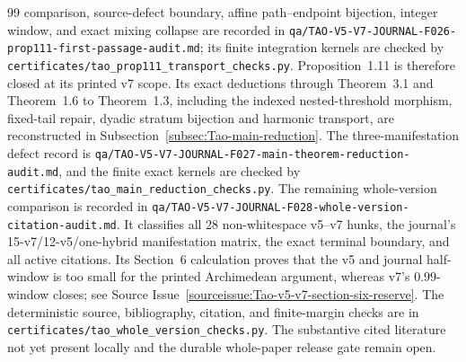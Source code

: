 \begin{thebibliography}{99}
comparison, source-defect boundary, affine path--endpoint bijection, integer
window, and exact mixing collapse are recorded in
\texttt{qa/TAO-V5-V7-JOURNAL-F026-prop111-first-passage-audit.md}; its finite
integration kernels are checked by
\texttt{certificates/tao\_prop111\_transport\_checks.py}.  Proposition~1.11
is therefore closed at its printed v7 scope.  Its exact deductions through
Theorem~3.1 and Theorem~1.6 to Theorem~1.3, including the indexed
nested-threshold morphism, fixed-tail repair, dyadic stratum bijection and
harmonic transport, are reconstructed in
Subsection~\ref{subsec:Tao-main-reduction}.  The three-manifestation defect
record is
\texttt{qa/TAO-V5-V7-JOURNAL-F027-main-theorem-reduction-audit.md}, and the
finite exact kernels are checked by
\texttt{certificates/tao\_main\_reduction\_checks.py}.  The remaining
whole-version comparison is recorded in
\texttt{qa/TAO-V5-V7-JOURNAL-F028-whole-version-citation-audit.md}.
It classifies all 28 non-whitespace v5--v7 hunks, the journal's
15-v7/12-v5/one-hybrid manifestation matrix, the exact terminal boundary,
and all active citations.  Its Section~6 calculation proves that the v5 and
journal half-window is too small for the printed Archimedean argument,
whereas v7's \(0.99\)-window closes; see
Source Issue~\ref{sourceissue:Tao-v5-v7-section-six-reserve}.  The
deterministic source, bibliography, citation, and finite-margin checks are in
\texttt{certificates/tao\_whole\_version\_checks.py}.  The substantive cited
literature not yet present locally and the durable whole-paper release gate
remain open.


\end{thebibliography}
